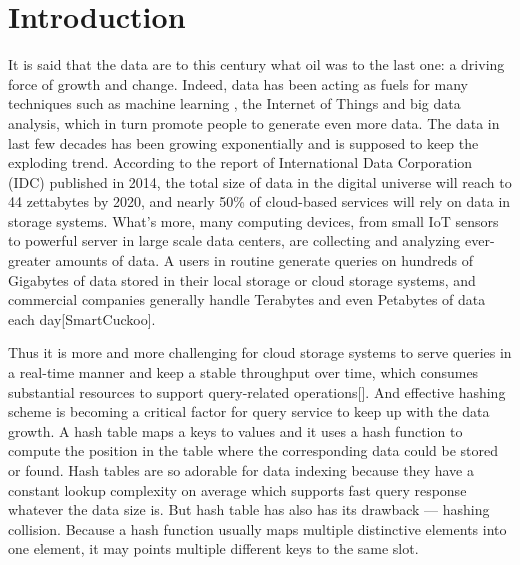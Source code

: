 \documentclass[12pt,conference,compsoc]{IEEEtran}
\begin{document}




%
\IEEEpeerreviewmaketitle



\section{Introduction}
It is said that the data are to this century what oil was to the last one: a driving force of growth and change. Indeed, data has been acting as fuels for many techniques such as machine learning , the Internet of Things and big data analysis, which in turn promote people to generate even more data. The data in last few decades has been growing exponentially and is supposed to keep the exploding trend. According to the report of International Data Corporation (IDC) published in 2014, the total size of data in the digital universe will reach to 44 zettabytes by 2020, and nearly 50\% of cloud-based services will rely on data in storage systems. What's more, many computing devices, from small IoT sensors to powerful server in large scale data centers, are collecting and analyzing ever-greater amounts of data. A users in routine generate queries on hundreds of Gigabytes of data stored in their local storage or cloud storage systems, and commercial companies generally handle Terabytes and even Petabytes of data each day[SmartCuckoo].

Thus it is more and more challenging for cloud storage systems to serve queries in a real-time manner and keep a stable throughput over time, which consumes substantial resources to support query-related operations[]. And effective hashing scheme is becoming a critical factor for query service to keep up with the data growth. A hash table maps a keys to values and it uses a hash function to compute the position in the table where the corresponding data could be stored or found. Hash tables are so adorable for data indexing because they have a constant lookup complexity on average which supports fast query response whatever the data size is. But hash table has also has its drawback --- hashing collision. Because a hash function usually maps multiple distinctive elements into one element, it may points multiple different keys to the same slot.
\end{document}
